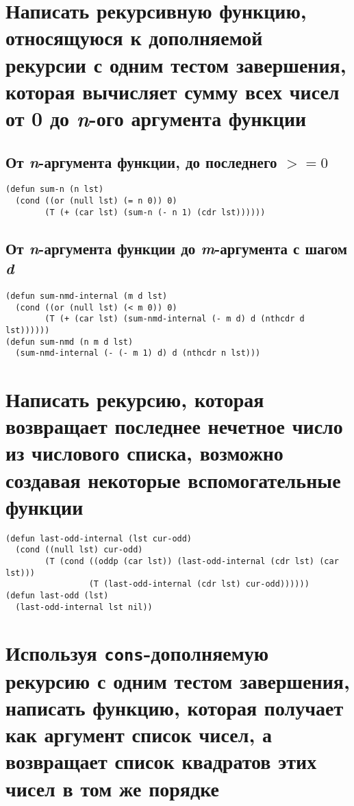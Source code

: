 \section{Написать рекурсивную функцию, относящуюся к дополняемой рекурсии с одним тестом завершения, которая вычисляет сумму всех чисел от 0 до \textit{n}-ого аргумента функции}

\subsection{От \textit{n}-аргумента функции, до последнего $>= 0$}

\begin{lstlisting}
(defun sum-n (n lst)
  (cond ((or (null lst) (= n 0)) 0)
        (T (+ (car lst) (sum-n (- n 1) (cdr lst))))))
\end{lstlisting}

\subsection{От \textit{n}-аргумента функции до \textit{m}-аргумента с шагом \textit{d}}

\begin{lstlisting}
(defun sum-nmd-internal (m d lst)
  (cond ((or (null lst) (< m 0)) 0)
        (T (+ (car lst) (sum-nmd-internal (- m d) d (nthcdr d lst))))))
(defun sum-nmd (n m d lst)
  (sum-nmd-internal (- (- m 1) d) d (nthcdr n lst)))
\end{lstlisting}

\section{Написать рекурсию, которая возвращает последнее нечетное число из числового списка, возможно создавая некоторые вспомогательные функции}

\begin{lstlisting}
(defun last-odd-internal (lst cur-odd)
  (cond ((null lst) cur-odd)
        (T (cond ((oddp (car lst)) (last-odd-internal (cdr lst) (car lst)))
                 (T (last-odd-internal (cdr lst) cur-odd))))))
(defun last-odd (lst)
  (last-odd-internal lst nil))
\end{lstlisting}

\section{Используя \texttt{cons}-дополняемую рекурсию с одним тестом завершения, написать функцию, которая получает как аргумент список чисел, а возвращает список квадратов этих чисел в том же порядке}

